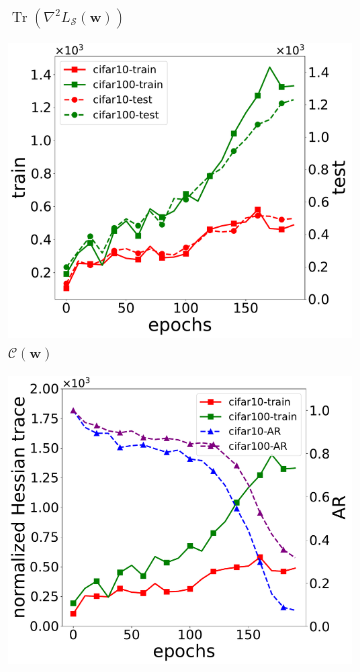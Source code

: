 \documentclass[letterpaper]{article} %
\theoremstyle{plain}
\theoremstyle{definition}
\begin{document}
\begin{figure}[ht!]
\begin{subfigure}{0.45\textwidth}
     \caption{$\operatorname{Tr}\left(\nabla^2 L_{\mathcal{S}}\left(\boldsymbol{w}\right)\right)$}
     \label{subfig:trace}
   \end{subfigure}
   \hfill
   \begin{subfigure}{0.45\textwidth}
     \centering
     \includegraphics[width=\textwidth]{figs/n_trace.pdf}
     \caption{$\mathcal{C}(\boldsymbol{w})$}
     \label{subfig:n_trace}
   \end{subfigure}
    \hspace{0.01\textwidth}
   \begin{subfigure}{0.45\textwidth}
     \centering
     \includegraphics[width=\textwidth]{figs/n_trace_vs_ar.pdf}

\end{subfigure}
\end{figure}
\end{document}
